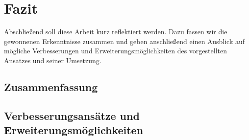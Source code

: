 %
\chapter{Fazit} %
Abschließend soll diese Arbeit kurz reflektiert werden. Dazu fassen wir die gewonnenen Erkenntnisse zusammen und geben
anschließend einen Ausblick auf mögliche Verbesserungen und Erweiterungsmöglichkeiten des vorgestellten Ansatzes und
seiner Umsetzung.

\section{Zusammenfassung}

\section{Verbesserungsansätze und Erweiterungsmöglichkeiten}
